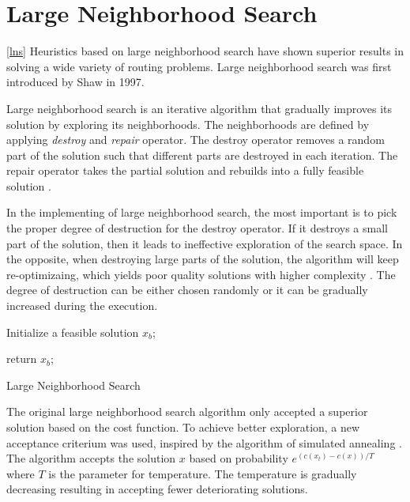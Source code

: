 \section{Large Neighborhood Search}\ref{lns}
Heuristics based on large neighborhood search have shown superior results in solving a wide variety of routing problems. Large neighborhood search was first introduced by Shaw \cite{shaw-lns} in 1997.

Large neighborhood search is an iterative algorithm that gradually improves its solution by exploring its neighborhoods. The neighborhoods are defined by applying \emph{destroy} and \emph{repair} operator. The destroy operator removes a random part of the solution such that different parts are destroyed in each iteration. The repair operator takes the partial solution and rebuilds into a fully feasible solution \cite{lns}.

In the implementing of large neighborhood search, the most important is to pick the proper degree of destruction for the destroy operator. If it destroys a small part of the solution, then it leads to ineffective exploration of the search space. In the opposite, when destroying large parts of the solution, the algorithm will keep re-optimizaing, which yields poor quality solutions with higher complexity \cite{lns}. The degree of destruction can be either chosen randomly or it can be gradually increased during the execution.\newline

\begin{algorithm}[H]
    \SetAlgoLined
    Initialize a feasible solution $x_b$;
    
        return $x_b$;
    \caption{Large Neighborhood Search}
\end{algorithm}

The original large neighborhood search algorithm only accepted a superior solution based on the cost function. To achieve better exploration, a new acceptance criterium was used, inspired by the algorithm of simulated annealing \cite{lns-anneling}. The algorithm accepts the solution $x$ based on probability $e^{(c(x_t) - c(x))/T}$ where $T$ is the parameter for temperature. The temperature is gradually decreasing resulting in accepting fewer deteriorating solutions.

